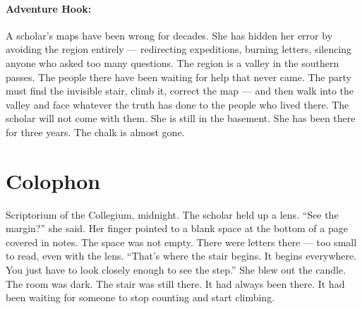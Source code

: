\paragraph{Adventure Hook:}
A scholar's maps have been wrong for decades. She has hidden her error by avoiding the region entirely — redirecting expeditions, burning letters, silencing anyone who asked too many questions. The region is a valley in the southern passes. The people there have been waiting for help that never came. The party must find the invisible stair, climb it, correct the map — and then walk into the valley and face whatever the truth has done to the people who lived there. The scholar will not come with them. She is still in the basement. She has been there for three years. The chalk is almost gone.

\section*{Colophon}
Scriptorium of the Collegium, midnight. The scholar held up a lens. ``See the margin?'' she said. Her finger pointed to a blank space at the bottom of a page covered in notes. The space was not empty. There were letters there — too small to read, even with the lens. ``That's where the stair begins. It begins everywhere. You just have to look closely enough to see the step.'' She blew out the candle. The room was dark. The stair was still there. It had always been there. It had been waiting for someone to stop counting and start climbing.